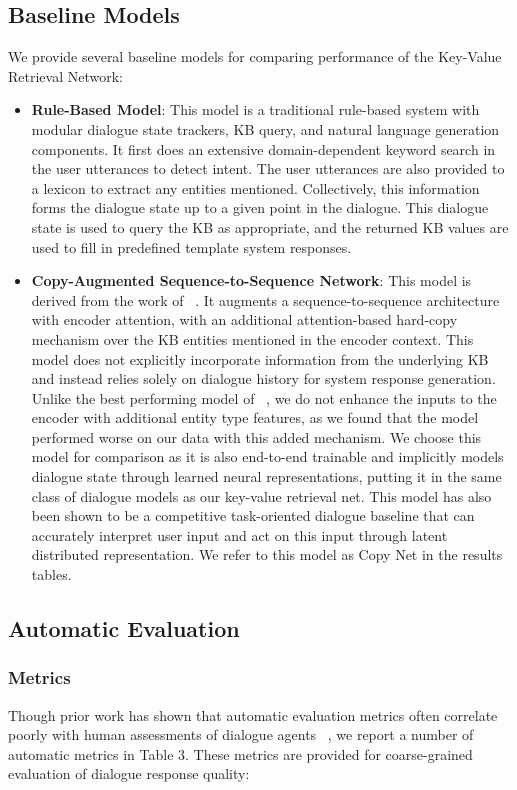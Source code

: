 \documentclass[11pt,a4paper]{article}
\begin{document}
\subsection{Baseline Models}
We provide several baseline models for comparing performance of the Key-Value Retrieval Network: 
\begin{itemize}
\item \textbf{Rule-Based Model}: This model is a traditional rule-based system with modular dialogue state trackers, KB query, and natural language generation components. It first does an extensive domain-dependent keyword search in the user utterances to detect intent. The user utterances are also provided to a lexicon to extract any entities mentioned. Collectively, this information forms the dialogue state up to a given point in the dialogue. This dialogue state is used to query the KB as appropriate, and the returned KB values are used to fill in predefined template system responses.

  \item \textbf{Copy-Augmented Sequence-to-Sequence Network}: This model is derived from the work of ~\cite{E17-2075}. It augments a sequence-to-sequence architecture with encoder attention, with an additional attention-based hard-copy mechanism over the KB entities mentioned in the encoder context. This model does not explicitly incorporate information from the underlying KB and instead relies solely on dialogue history for system response generation. Unlike the best performing model of ~\cite{E17-2075}, we do not enhance the inputs to the encoder with additional entity type features, as we found that the model performed worse on our data with this added mechanism. We choose this model for comparison as it is also end-to-end trainable and implicitly models dialogue state through learned neural representations, putting it in the same class of dialogue models as our key-value retrieval net. This model has also been shown to be a competitive task-oriented dialogue baseline that can accurately interpret user input and act on this input through latent distributed representation. We refer to this model as Copy Net in the results tables.

\end{itemize}

\subsection{Automatic Evaluation}

\subsubsection{Metrics}
Though prior work has shown that automatic evaluation metrics often correlate poorly with human assessments of dialogue agents ~\cite{liu-EtAl:2016:EMNLP20163}, we report a number of automatic metrics in Table 3. These metrics are provided for coarse-grained evaluation of dialogue response quality:
\end{document}
